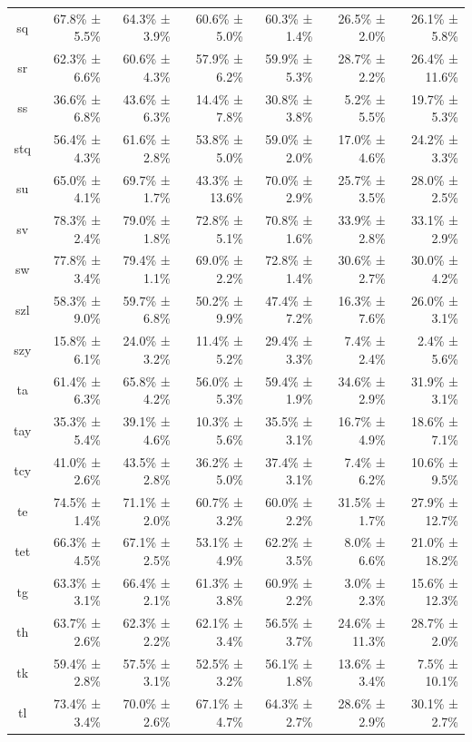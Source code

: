 \documentclass[10pt, a4paper]{article}
\begin{document}
\begin{table}[h]
\begin{tabular}{crrrrrr}
sq & 67.8\% ± 5.5\% & 64.3\% ± 3.9\% & 60.6\% ± 5.0\% & 60.3\% ± 1.4\% & 26.5\% ± 2.0\% & 26.1\% ± 5.8\% \\
sr & 62.3\% ± 6.6\% & 60.6\% ± 4.3\% & 57.9\% ± 6.2\% & 59.9\% ± 5.3\% & 28.7\% ± 2.2\% & 26.4\% ± 11.6\% \\
ss & 36.6\% ± 6.8\% & 43.6\% ± 6.3\% & 14.4\% ± 7.8\% & 30.8\% ± 3.8\% & 5.2\% ± 5.5\% & 19.7\% ± 5.3\% \\
stq & 56.4\% ± 4.3\% & 61.6\% ± 2.8\% & 53.8\% ± 5.0\% & 59.0\% ± 2.0\% & 17.0\% ± 4.6\% & 24.2\% ± 3.3\% \\
su & 65.0\% ± 4.1\% & 69.7\% ± 1.7\% & 43.3\% ± 13.6\% & 70.0\% ± 2.9\% & 25.7\% ± 3.5\% & 28.0\% ± 2.5\% \\
sv & 78.3\% ± 2.4\% & 79.0\% ± 1.8\% & 72.8\% ± 5.1\% & 70.8\% ± 1.6\% & 33.9\% ± 2.8\% & 33.1\% ± 2.9\% \\
sw & 77.8\% ± 3.4\% & 79.4\% ± 1.1\% & 69.0\% ± 2.2\% & 72.8\% ± 1.4\% & 30.6\% ± 2.7\% & 30.0\% ± 4.2\% \\
szl & 58.3\% ± 9.0\% & 59.7\% ± 6.8\% & 50.2\% ± 9.9\% & 47.4\% ± 7.2\% & 16.3\% ± 7.6\% & 26.0\% ± 3.1\% \\
szy & 15.8\% ± 6.1\% & 24.0\% ± 3.2\% & 11.4\% ± 5.2\% & 29.4\% ± 3.3\% & 7.4\% ± 2.4\% & 2.4\% ± 5.6\% \\
ta & 61.4\% ± 6.3\% & 65.8\% ± 4.2\% & 56.0\% ± 5.3\% & 59.4\% ± 1.9\% & 34.6\% ± 2.9\% & 31.9\% ± 3.1\% \\
tay & 35.3\% ± 5.4\% & 39.1\% ± 4.6\% & 10.3\% ± 5.6\% & 35.5\% ± 3.1\% & 16.7\% ± 4.9\% & 18.6\% ± 7.1\% \\
tcy & 41.0\% ± 2.6\% & 43.5\% ± 2.8\% & 36.2\% ± 5.0\% & 37.4\% ± 3.1\% & 7.4\% ± 6.2\% & 10.6\% ± 9.5\% \\
te & 74.5\% ± 1.4\% & 71.1\% ± 2.0\% & 60.7\% ± 3.2\% & 60.0\% ± 2.2\% & 31.5\% ± 1.7\% & 27.9\% ± 12.7\% \\
tet & 66.3\% ± 4.5\% & 67.1\% ± 2.5\% & 53.1\% ± 4.9\% & 62.2\% ± 3.5\% & 8.0\% ± 6.6\% & 21.0\% ± 18.2\% \\
tg & 63.3\% ± 3.1\% & 66.4\% ± 2.1\% & 61.3\% ± 3.8\% & 60.9\% ± 2.2\% & 3.0\% ± 2.3\% & 15.6\% ± 12.3\% \\
th & 63.7\% ± 2.6\% & 62.3\% ± 2.2\% & 62.1\% ± 3.4\% & 56.5\% ± 3.7\% & 24.6\% ± 11.3\% & 28.7\% ± 2.0\% \\
tk & 59.4\% ± 2.8\% & 57.5\% ± 3.1\% & 52.5\% ± 3.2\% & 56.1\% ± 1.8\% & 13.6\% ± 3.4\% & 7.5\% ± 10.1\% \\
tl & 73.4\% ± 3.4\% & 70.0\% ± 2.6\% & 67.1\% ± 4.7\% & 64.3\% ± 2.7\% & 28.6\% ± 2.9\% & 30.1\% ± 2.7\% \\

\end{tabular}
\end{table}
\end{document}
